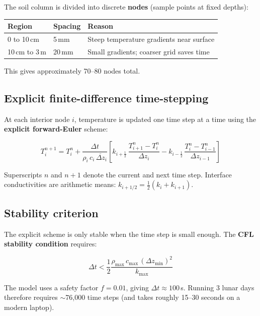 \documentclass[12pt, a4paper]{article}
\begin{document}
The soil column is divided into discrete \textbf{nodes}
(sample points at fixed depths):

\begin{center}
\begin{tabular}{lll}
\toprule
Region & Spacing & Reason \\
\midrule
0 to 10\,cm & 5\,mm & Steep temperature gradients near surface \\
10\,cm to 3\,m & 20\,mm & Small gradients; coarser grid saves time \\
\bottomrule
\end{tabular}
\end{center}

This gives approximately 70--80 nodes total.

\subsection{Explicit finite-difference time-stepping}

At each interior node $i$, temperature is updated one time step
at a time using the \textbf{explicit forward-Euler} scheme:

\begin{equation}
  T_i^{n+1} = T_i^n +
  \frac{\Delta t}{\rho_i\,c_i\,\overline{\Delta z}_i}
  \left[
    k_{i+\frac{1}{2}}\,\frac{T_{i+1}^n - T_i^n}{\Delta z_i}
    -
    k_{i-\frac{1}{2}}\,\frac{T_i^n - T_{i-1}^n}{\Delta z_{i-1}}
  \right]
  \label{eq:fd}
\end{equation}

Superscripts $n$ and $n+1$ denote the current and next time step.
Interface conductivities are arithmetic means:
$k_{i+1/2} = \tfrac{1}{2}(k_i + k_{i+1})$.

\subsection{Stability criterion}

The explicit scheme is only stable when the time step is small
enough.
The \textbf{CFL stability condition} requires:

\begin{equation}
  \Delta t < \frac{1}{2}
  \frac{\rho_{\max}\,c_{\max}\,(\Delta z_{\min})^2}{k_{\max}}
  \label{eq:stability}
\end{equation}

The model uses a safety factor $f = 0.01$, giving
$\Delta t \approx 100$\,s.
Running 3 lunar days therefore requires $\sim$76{,}000 time steps
(and takes roughly 15--30 seconds on a modern laptop).
\end{document}
